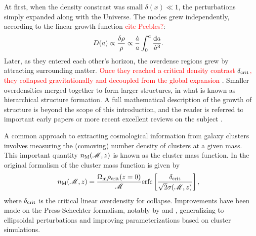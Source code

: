 At first, when the density constrast was small $\delta(x) \ll 1$, the perturbations simply expanded along with the Universe. The modes grew independently, according to the linear growth function \citep{Voit05} \textcolor{red}{cite Peebles?}:
\begin{equation}
D(a) \propto \frac{\delta \rho}{\rho} \propto \frac{\dot{a}}{a} \int_0^a \frac{{\rm d}a}{\dot{a}^3}.
\end{equation}
Later, as they entered each other's horizon, the overdense regions grew by attracting surrounding matter. \textcolor{red}{Once they reached a critical density contrast $\delta_{\rm crit}$, they collapsed gravitationally and decoupled from the global expansion} \citep{Schneider06_IntroGravLensCosmology}. Smaller overdensities merged together to form larger structures, in what is known as hierarchical structure formation. A full mathematical description of the growth of structure is beyond the scope of this introduction,  and the reader is referred to important early papers \citep[e.g.][]{PS74,GottRees75} or more recent excellent reviews on the subject \citep[e.g.][]{Voit05,Schneider06_IntroGravLensCosmology,Kravtsov12}. 

A common approach to extracting cosmological information from galaxy clusters involves measuring the (comoving) number density of clusters at a given mass.  This important quantity $n_{\rm M} ({\mathscr M},z)$ is known as the cluster mass function. In the original formalism of \citet{PS74} the cluster mass function is given by
\begin{equation}
\label{eqn:massfunc}
n_{\rm M} ({\mathscr M},z) = \frac{\Omega_{\rm m} \rho_{\rm crit}(z=0)}{\mathscr M} {\rm erfc}\left[ \frac{\delta_{\rm crit}}{\sqrt{2}\sigma({\mathscr M},z)} \right],
\end{equation}
where $\delta_{\rm crit}$ is the critical linear overdensity for collapse. Improvements have been made on the Press-Schechter formalism, notably by \citet{Sheth99} and \citet{Jenkins01}, generalizing to ellipsoidal perturbations and improving parameterizations based on cluster simulations. 


